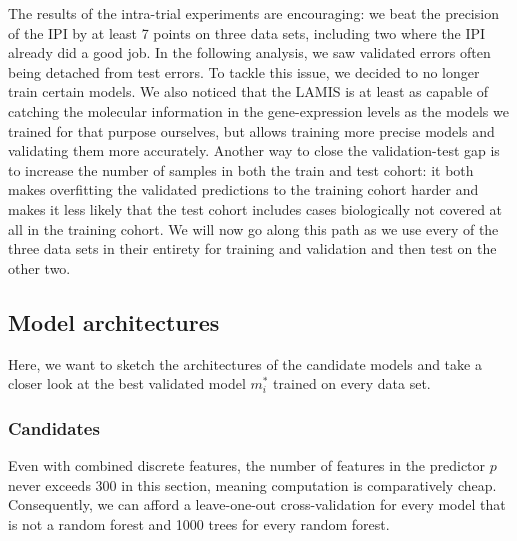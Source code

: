 The results of the intra-trial experiments are encouraging: we beat the precision of the IPI by 
at least \num{7} points on three data sets, including two where the IPI already did a good job. 
In the following analysis, we saw validated errors often being detached from test errors. To tackle 
this issue, we decided to no longer train certain models. We also noticed that the LAMIS is at least 
as capable of catching the molecular information in the gene-expression levels as the models
we trained for that purpose ourselves, but allows training more precise models and validating them 
more accurately. Another way to close the validation-test gap is to increase the number of samples 
in both the train and test cohort: it both makes overfitting the validated predictions to the 
training cohort harder and makes it less likely that the test cohort includes cases biologically 
not covered at all in the training cohort. We will now go along this path as we use every of the 
three data sets in their entirety for training and validation and then test on the other two.

\subsection{Model architectures}

Here, we want to sketch the architectures of the candidate models and take a closer look at the 
best validated model $m_i^*$ trained on every data set.

\subsubsection{Candidates}

Even with combined discrete features, the number of features in the predictor $p$ 
never exceeds \num{300} in this section, meaning computation is comparatively cheap. 
Consequently, we can afford 
a leave-one-out cross-validation for every model that is not a random forest and \num{1000} trees 
for every random forest.

